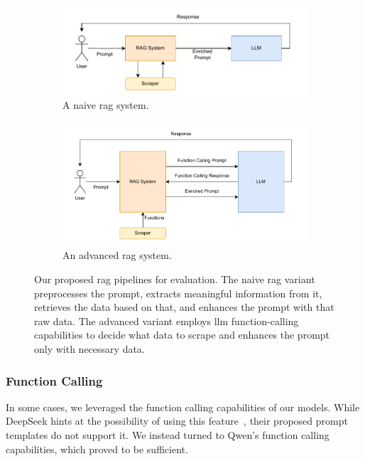 \documentclass[fleqn,moreauthors,10pt]{ds_report}
\begin{document}
\begin{figure}
    \centering
    \begin{subfigure}{0.4\textwidth}
        \includegraphics[width=\textwidth]{./figures/simple_rag.pdf}
        \caption{A naive \ac{rag} system.}
    \end{subfigure}
    \hspace{20pt}
    \begin{subfigure}{0.4\textwidth}
        \includegraphics[width=\linewidth]{./figures/advanced_rag.pdf}
        \caption{An advanced \ac{rag} system.}
    \end{subfigure}
    \caption{Our proposed \ac{rag} pipelines for evaluation. The naive \ac{rag} variant preprocesses the prompt, extracts meaningful information from it, retrieves the data based on that, and enhances the prompt with that raw data. The advanced variant employs \ac{llm} function-calling capabilities to decide what data to scrape and enhances the prompt only with necessary data.}
    \label{fig:pipeline}
\end{figure}

\subsubsection*{Function Calling}

In some cases, we leveraged the function calling capabilities of our models. While DeepSeek hints at the possibility of using this feature~\cite{deepseekFunctionCalling}, their proposed prompt templates do not support it. We instead turned to Qwen's function calling capabilities, which proved to be sufficient.
\end{document}
